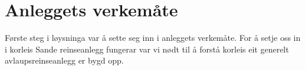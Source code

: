 \chapter{Anleggets verkemåte}
\thispagestyle{fancy}

Første steg i løysninga var å sette seg inn i anleggets verkemåte.\newline
For å setje oss in i korleis Sande reinseanlegg fungerar var vi nødt til å forstå
korleis eit generelt avlaupsreinseanlegg er bygd opp.


